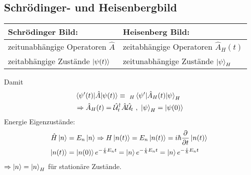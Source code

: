\subsection{Schrödinger- und Heisenbergbild} 
		\begin{tabular}{p{} | p{}}
			Schrödinger Bild: & Heisenberg Bild: \\ \hline
			zeitunabhängige Operatoren $\hat{A}$ & zeitabhängige Operatoren $\hat{A}_H(t)$ \\
			zeitabhängige Zustände $\ket{\psi(t)}$ & zeitunabhängige Zustände $\ket{\psi}_H$
		\end{tabular}
		
	Damit 
		\begin{align*} %
			&\braket{\psi'(t) | \hat{A} | \psi(t)} \equiv~_H\braket{\psi' | \hat{A}_H(t) | \psi}_H \\
			&\Rightarrow \hat{A}_H(t) = \hat{\U}_t^\dagger \hat{A} \hat{\U}_t ~,~ \ket{\psi}_H = \ket{\psi(0)}
		\end{align*}	
	Energie Eigenzustände:
		\begin{align*}
			\hat{H} \ket{n} &= E_n \ket{n} \Rightarrow H \ket{n(t)} = E_n \ket{n(t)} = i\hbar \frac{\partial}{\partial t} \ket{n(t)} \\
			\ket{n(t)} &= \ket{n(0)} e^{-\frac{i}{\hbar} E_n t} = \ket{n} e^{- \frac{i}{\hbar} E_n t} = \ket{n} e^{-\frac{i}{\hbar} E_n t} 
		\end{align*}
	$\Rightarrow \ket{n} = \ket{n}_H$ für \grqq stationäre \grqq Zustände.
	
